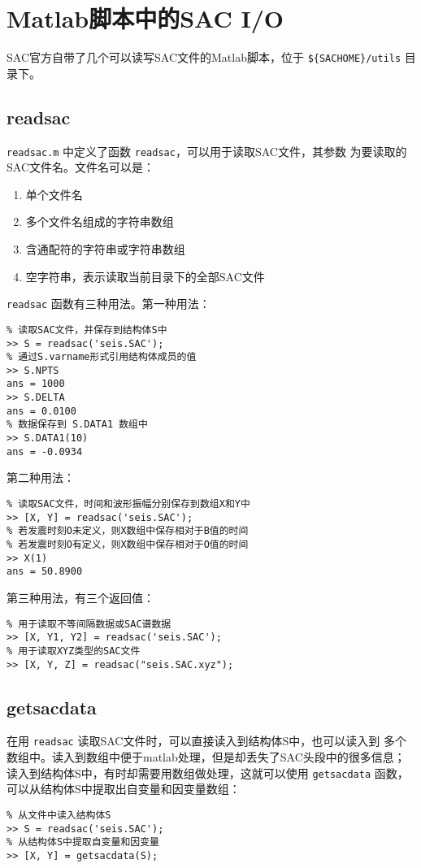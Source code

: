 \section{Matlab脚本中的SAC I/O}
SAC官方自带了几个可以读写SAC文件的Matlab脚本，位于 \verb|${SACHOME}/utils| 目录下。

\subsection{readsac}
\verb+readsac.m+ 中定义了函数 \verb|readsac|，可以用于读取SAC文件，其参数
为要读取的SAC文件名。文件名可以是：
\begin{enumerate}
\item 单个文件名
\item 多个文件名组成的字符串数组
\item 含通配符的字符串或字符串数组
\item 空字符串，表示读取当前目录下的全部SAC文件
\end{enumerate}

\verb|readsac| 函数有三种用法。第一种用法：
\begin{verbatim}
% 读取SAC文件，并保存到结构体S中
>> S = readsac('seis.SAC');
% 通过S.varname形式引用结构体成员的值
>> S.NPTS
ans = 1000
>> S.DELTA
ans = 0.0100
% 数据保存到 S.DATA1 数组中
>> S.DATA1(10)
ans = -0.0934
\end{verbatim}

第二种用法：
\begin{verbatim}
% 读取SAC文件，时间和波形振幅分别保存到数组X和Y中
>> [X, Y] = readsac('seis.SAC');
% 若发震时刻O未定义，则X数组中保存相对于B值的时间
% 若发震时刻O有定义，则X数组中保存相对于O值的时间
>> X(1)
ans = 50.8900
\end{verbatim}

第三种用法，有三个返回值：
\begin{verbatim}
% 用于读取不等间隔数据或SAC谱数据
>> [X, Y1, Y2] = readsac('seis.SAC');
% 用于读取XYZ类型的SAC文件
>> [X, Y, Z] = readsac("seis.SAC.xyz");
\end{verbatim}

\subsection{getsacdata}
在用 \verb|readsac| 读取SAC文件时，可以直接读入到结构体S中，也可以读入到
多个数组中。读入到数组中便于matlab处理，但是却丢失了SAC头段中的很多信息；
读入到结构体S中，有时却需要用数组做处理，这就可以使用 \verb|getsacdata|
函数，可以从结构体S中提取出自变量和因变量数组：
\begin{verbatim}
% 从文件中读入结构体S
>> S = readsac('seis.SAC');
% 从结构体S中提取自变量和因变量
>> [X, Y] = getsacdata(S);
\end{verbatim}

